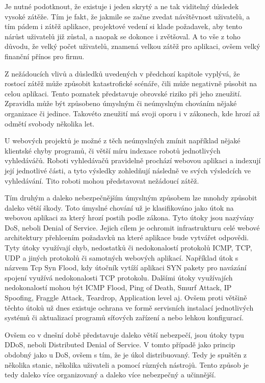 \documentclass[12pt]{article}
\begin{document}
Je nutné podotknout, že existuje i jeden skrytý a ne tak viditelný důsledek vysoké zátěže. Tím je fakt, že jakmile se začne zvedat návštěvnost uživatelů, a tím pádem i zátěž aplikace, projektové vedení si klade požadavek, aby tento nárůst uživatelů již zůstal, a naopak se dokonce i zvětšoval. A to vše z toho důvodu, že velký počet uživatelů, znamená velkou zátěž pro aplikaci, ovšem velký finanční přínos pro firmu.



Z nežádoucích vlivů a důsledků uvedených v předchozí kapitole vyplývá, že rostocí zátěž může způsobit katastrofické scénáře, čili může negativně působit na celou aplikaci. Tento poznatek představuje obrovské riziko při jeho zneužití. Zpravidla může být způsobeno úmyslným či neúmyslným chováním nějaké organizace či jedince. Takovéto zneužití má svoji oporu i v zákonech, kde hrozí až odmětí svobody několika let.

U webových projektů je možné z těch neúmyslných zmínit například nějaké klientské chyby programů, či větší míru indexace robotů jednotlivých vyhledáváčů. Roboti vyhledávačů pravidelně prochází webovou aplikaci a indexují její jednotlivé části, a tyto výsledky zohledňují následně ve svých výsledcích ve vyhledávání. Tito roboti mohou představovat nežádoucí zátěž.

Tím druhým a daleko nebezpečnějším úmyslným způsobem lze mnohdy způsobit daleko větší škody. Toto úmyslné chování už je klasifikováno jako útok na webovou aplikaci za který hrozí postih podle zákona. Tyto útoky jsou nazývány DoS, neboli Denial of Service. Jejich cílem je ochromit infrastrukturu celé webové architektury přehlcením požadavků na které aplikace bude vytvářet odpovědi. Tyty útoky využívají chyb, nedostatků či nedokonalostí protokolů ICMP, TCP, UDP a jiných protokolů či samotných webových aplikací. Například útok s názvem Tcp Syn Flood, kdy útočník vytíží aplikaci SYN pakety pro navázání spojení využívá nedokonalosti TCP protokolu. Dalšími útoky využívajích nedokonalostí mohou být ICMP Flood, Ping of Death, Smurf Attack, IP Spoofing, Fraggle Attack, Teardrop, Application level aj. Ovšem proti většině těchto útoků už dnes existuje ochrana ve formě servisních instalací jednotlivých systémů či aktualizací programů síťových zařízení a nebo lehkou konfigurací. \cite{dos}

Ovšem co v dnešní době představuje daleko větší nebezpečí, jsou útoky typu DDoS, neboli Distributed Denial of Service. V tomto případě jako princip obdobný jako u DoS, ovšem s tím, že je úkol distribuovaný. Tedy je spuštěn z několika stanic, několika uživateli a pomocí různých nástrojů. Tento způsob je tedy daleko více organizovaný a daleko více nebezpečný a učinnější. \cite{dos}
\end{document}
